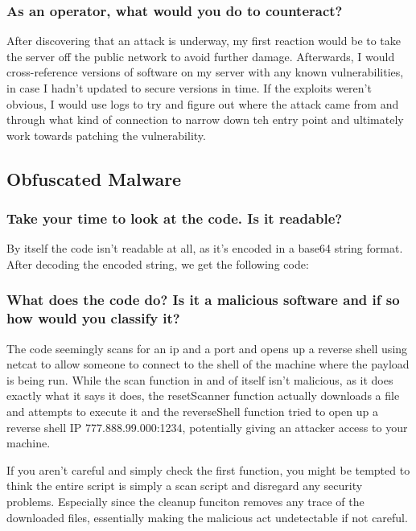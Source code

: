 \subsubsection{As an operator, what would you do to counteract?}
After discovering that an attack is underway, my first reaction would be to take the server off the public network to avoid further damage. Afterwards, I would cross-reference versions of software on my server with any known vulnerabilities, in case I hadn't updated to secure versions in time. If the exploits weren't obvious, I would use logs to try and figure out where the attack came from and through what kind of connection to narrow down teh entry point and ultimately work towards patching the vulnerability.

\subsection{Obfuscated Malware}
\subsubsection{Take your time to look at the code. Is it readable?}
By itself the code isn't readable at all, as it's encoded in a base64 string format. After decoding the encoded string, we get the following code:

\subsubsection{What does the code do? Is it a malicious software and if so how would you classify it?}
The code seemingly scans for an ip and a port and opens up a reverse shell using netcat to allow someone to connect to the shell of the machine where the payload is being run. While the scan function in and of itself isn't malicious, as it does exactly what it says it does, the resetScanner function actually downloads a file and attempts to execute it and the reverseShell function tried to open up a reverse shell IP 777.888.99.000:1234, potentially giving an attacker access to your machine.

If you aren't careful and simply check the first function, you might be tempted to think the entire script is simply a scan script and disregard any security problems. Especially since the cleanup funciton removes any trace of the downloaded files, essentially making the malicious act undetectable if not careful.
